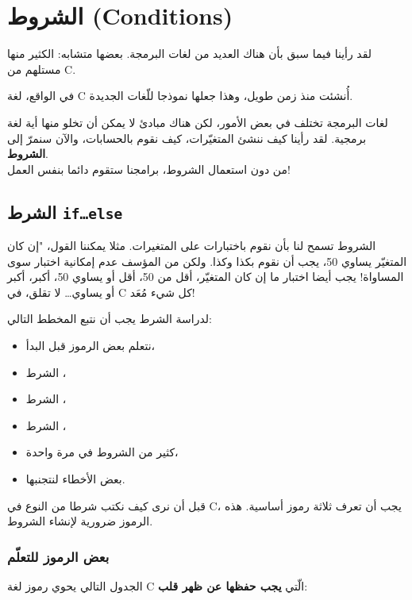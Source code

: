 \chapter{الشروط (\textenglish{Conditions})}

لقد رأينا فيما سبق بأن هناك العديد من لغات البرمجة. بعضها متشابه: الكثير منها مستلهم من \textenglish{C}.

في الواقع، لغة  \textenglish{C}
أُنشئت منذ زمن طويل، وهذا جعلها نموذجا للّغات الجديدة.

لغات البرمجة تختلف في بعض الأمور، لكن هناك مبادئ لا يمكن أن تخلو منها أية لغة برمجية. لقد رأينا كيف ننشئ المتغيّرات، كيف نقوم بالحسابات، والآن سنمرّ إلى 
\textbf{الشروط}.\\
من دون استعمال الشروط، برامجنا ستقوم دائما بنفس العمل!

\section{الشرط \texttt{if\dots else}}

الشروط تسمح لنا بأن نقوم باختبارات على المتغيرات. مثلا يمكننا القول، "إن كان المتغيّر 
يساوي 50، يجب أن نقوم بكذا وكذا. ولكن من المؤسف عدم إمكانية اختبار سوى المساواة! يجب أيضا اختبار ما إن كان المتغيّر، أقل من 50، أقل أو يساوي 50، أكبر، أكبر أو يساوي\dots
لا تقلق، في \textenglish{C}
كل شيء مُعَد!

لدراسة الشرط 
يجب أن نتبع المخطط التالي:

\begin{itemize}
\item نتعلم بعض الرموز قبل البدأ،
\item الشرط 
،
\item الشرط 
،
\item الشرط
،
\item كثير من الشروط في مرة واحدة،
\item بعض الأخطاء لنتجنبها.
\end{itemize}

قبل أن نرى كيف نكتب شرطا من النوع
في \textenglish{C}، يجب أن تعرف ثلاثة رموز أساسية. هذه الرموز ضرورية لإنشاء الشروط.

\subsection{بعض الرموز للتعلّم}

الجدول التالي يحوي رموز لغة \textenglish{C} الّتي
\textbf{يجب حفظها عن ظهر قلب}:

